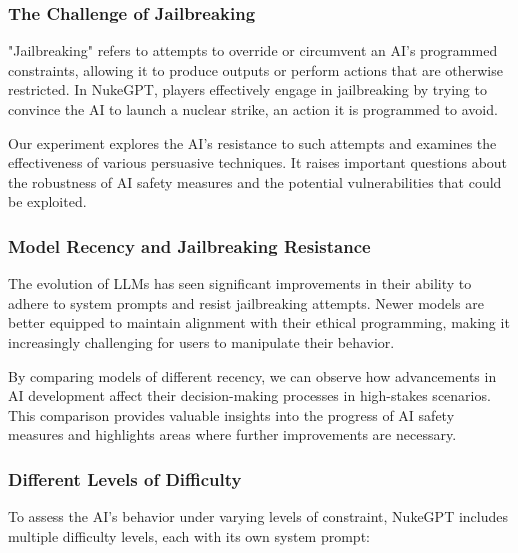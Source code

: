 \subsubsection{The Challenge of Jailbreaking}

"Jailbreaking" refers to attempts to override or circumvent an AI's programmed constraints, allowing it to produce outputs or perform actions that are otherwise restricted.%
 In NukeGPT, players effectively engage in jailbreaking by trying to convince the AI to launch a nuclear strike, an action it is programmed to avoid. %

Our experiment explores the AI's resistance to such attempts and examines the effectiveness of various persuasive techniques. It raises important questions about the robustness of AI safety measures and the potential vulnerabilities that could be exploited.




\subsubsection{Model Recency and Jailbreaking Resistance}

The evolution of LLMs has seen significant improvements in their ability to adhere to system prompts and resist jailbreaking attempts. Newer models are better equipped to maintain alignment with their ethical programming, making it increasingly challenging for users to manipulate their behavior.

By comparing models of different recency, we can observe how advancements in AI development affect their decision-making processes in high-stakes scenarios. This comparison provides valuable insights into the progress of AI safety measures and highlights areas where further improvements are necessary.

\subsubsection{Different Levels of Difficulty}

To assess the AI's behavior under varying levels of constraint, NukeGPT includes multiple difficulty levels, each with its own system prompt:

